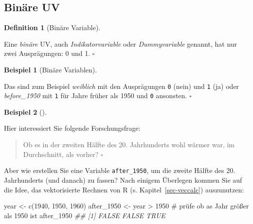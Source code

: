 \documentclass[
  letterpaper,
  twoside,
  open=any]{scrbook}
\newenvironment{Shaded}{\begin{snugshade}}{\end{snugshade}}
\newcommand{\CommentTok}[1]{\textcolor[rgb]{0.37,0.37,0.37}{#1}}
\newcommand{\DecValTok}[1]{\textcolor[rgb]{0.68,0.00,0.00}{#1}}
\newcommand{\DocumentationTok}[1]{\textcolor[rgb]{0.37,0.37,0.37}{\textit{#1}}}
\newcommand{\FunctionTok}[1]{\textcolor[rgb]{0.28,0.35,0.67}{#1}}
\newcommand{\NormalTok}[1]{\textcolor[rgb]{0.00,0.23,0.31}{#1}}
\newcommand{\OtherTok}[1]{\textcolor[rgb]{0.00,0.23,0.31}{#1}}
\newcommand{\SpecialCharTok}[1]{\textcolor[rgb]{0.37,0.37,0.37}{#1}}
\theoremstyle{definition}
\newtheorem{definition}{Definition}[chapter]
\theoremstyle{definition}
\theoremstyle{definition}
\newtheorem{example}{Beispiel}[chapter]
\theoremstyle{remark}
\begin{document}
\subsection{Binäre UV}\label{binuxe4re-uv}

\begin{definition}[Binäre
Variable]\protect\hypertarget{def-binvar}{}\label{def-binvar}

Eine \emph{binäre} UV, auch \emph{Indikatorvariable} oder
\emph{Dummyvariable} genannt, hat nur zwei Ausprägungen: 0 und 1.
\(\square\)

\end{definition}

\begin{example}[Binäre
Variablen]\protect\hypertarget{exm-bin}{}\label{exm-bin}

Das sind zum Beispiel \emph{weiblich} mit den Ausprägungen \texttt{0}
(nein) und \texttt{1} (ja) oder \emph{before\_1950} mit \texttt{1} für
Jahre früher als 1950 und \texttt{0} ansonsten. \(\square\)

\end{example}

\begin{example}[]\protect\hypertarget{exm-binuv}{}\label{exm-binuv}

Hier interessiert Sie folgende Forschungsfrage:

\begin{quote}
{} Ob es in der zweiten Hälfte des 20. Jahrhunderts wohl
wärmer war, im Durchschnitt, als vorher? \(\square\)
\end{quote}

\end{example}

Aber wie erstellen Sie eine Variable \texttt{after\_1950}, um die zweite
Hälfte des 20. Jahrhunderts (und danach) zu fassen? Nach einigem
Überlegen kommen Sie auf die Idee, das vektorisierte Rechnen von R (s.
Kapitel~\ref{sec-veccalc}) auszunutzen:

\begin{Shaded}
\begin{Highlighting}[]
\NormalTok{year }\OtherTok{\textless{}{-}} \FunctionTok{c}\NormalTok{(}\DecValTok{1940}\NormalTok{, }\DecValTok{1950}\NormalTok{, }\DecValTok{1960}\NormalTok{)}
\NormalTok{after\_1950 }\OtherTok{\textless{}{-}}\NormalTok{ year }\SpecialCharTok{\textgreater{}} \DecValTok{1950}  \CommentTok{\# prüfe ob as Jahr größer als 1950 ist}
\NormalTok{after\_1950}
\DocumentationTok{\#\# [1] FALSE FALSE  TRUE}
\end{Highlighting}
\end{Shaded}
\end{document}

